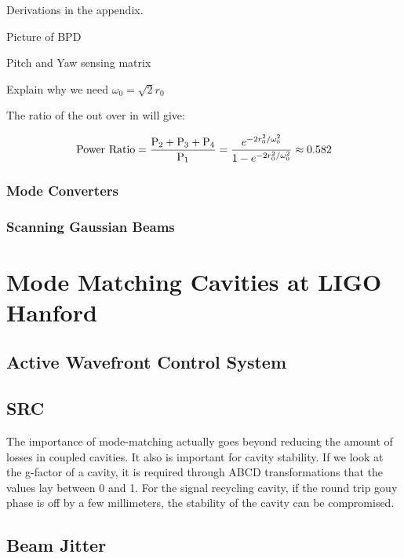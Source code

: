 \documentclass[oneside]{book}
\begin{document}
		Derivations in the appendix.
		
		Picture of BPD
		
		Pitch and Yaw sensing matrix
		
		Explain why we need $\omega_{0} = \sqrt{2} r_0$
		
		The ratio of the out over in will give:
		
		\begin{equation}
		\text{Power Ratio} = \frac{\text{P}_2 + \text{P}_3 + \text{P}_4}{\text{P}_1}  \\
		= \frac{e^{-2r_0^2/ \omega_{0}^2}} {1 - e^{-2r_0^2/ \omega_{0}^2 }} \approx 0.582
		\end{equation}
		
		\subsection{Mode Converters}
		
		\subsection{Scanning Gaussian Beams}
		

\chapter{Mode Matching Cavities at LIGO Hanford}

	\section{Active Wavefront Control System}
	
	\section{SRC}
	The importance of mode-matching actually goes beyond reducing the amount of losses in coupled cavities.  It also is important for cavity stability.  If we look at the g-factor of a cavity, it is required through ABCD transformations that the values lay between 0 and 1.  For the signal recycling cavity, if the round trip gouy phase is off by a few millimeters, the stability of the cavity can be compromised. 
	
	
	\section{Beam Jitter}
	
\end{document}
